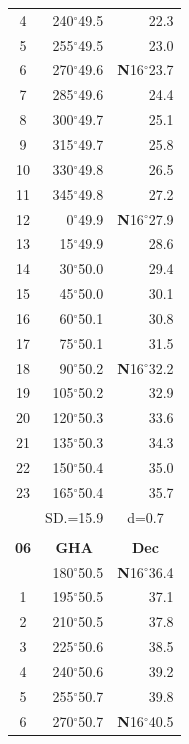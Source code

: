 \documentclass[10pt, a4paper]{report}
\begin{document}
\begin{scriptsize}
\begin{tabular*}{0.2\textwidth}[t]{@{\extracolsep{\fill}}|c|rr|}
4 & 240$^\circ$49.5 & 22.3\\
5 & 255$^\circ$49.5 & 23.0\\[2Pt]
6 & 270$^\circ$49.6 & \textbf{N}16$^\circ$23.7\\
7 & 285$^\circ$49.6 & 24.4\\
8 & 300$^\circ$49.7 & 25.1\\
9 & 315$^\circ$49.7 & \raisebox{0.24ex}{\boldmath$\cdot$~\boldmath$\cdot$~~}25.8\\
10 & 330$^\circ$49.8 & 26.5\\
11 & 345$^\circ$49.8 & 27.2\\[2Pt]
12 & 0$^\circ$49.9 & \textbf{N}16$^\circ$27.9\\
13 & 15$^\circ$49.9 & 28.6\\
14 & 30$^\circ$50.0 & 29.4\\
15 & 45$^\circ$50.0 & \raisebox{0.24ex}{\boldmath$\cdot$~\boldmath$\cdot$~~}30.1\\
16 & 60$^\circ$50.1 & 30.8\\
17 & 75$^\circ$50.1 & 31.5\\[2Pt]
18 & 90$^\circ$50.2 & \textbf{N}16$^\circ$32.2\\
19 & 105$^\circ$50.2 & 32.9\\
20 & 120$^\circ$50.3 & 33.6\\
21 & 135$^\circ$50.3 & \raisebox{0.24ex}{\boldmath$\cdot$~\boldmath$\cdot$~~}34.3\\
22 & 150$^\circ$50.4 & 35.0\\
23 & 165$^\circ$50.4 & 35.7\\
\hline
\rule{0pt}{2.4ex} & \multicolumn{1}{c}{SD.=15.9} & \multicolumn{1}{c|}{d=0.7}\\
\hline
\multicolumn{1}{c}{}\\[-0.5ex]\hline
\multicolumn{1}{|c|}{\rule{0pt}{2.6ex}\textbf{06}} & \multicolumn{1}{c}{\textbf{GHA}} & \multicolumn{1}{c|}{\textbf{Dec}}\\
\hline\rule{0pt}{2.6ex}\noindent
0 & 180$^\circ$50.5 & \textbf{N}16$^\circ$36.4\\
1 & 195$^\circ$50.5 & 37.1\\
2 & 210$^\circ$50.5 & 37.8\\
3 & 225$^\circ$50.6 & \raisebox{0.24ex}{\boldmath$\cdot$~\boldmath$\cdot$~~}38.5\\
4 & 240$^\circ$50.6 & 39.2\\
5 & 255$^\circ$50.7 & 39.8\\[2Pt]
6 & 270$^\circ$50.7 & \textbf{N}16$^\circ$40.5\\

\end{tabular*}
\end{scriptsize}
\end{document}
